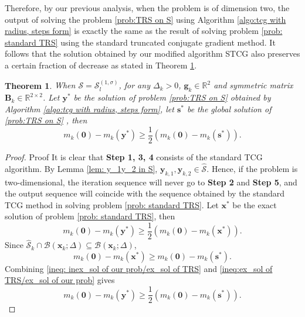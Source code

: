 \documentclass[colorlinks=true, linkcolor=blue, citecolor=blue, urlcolor=blue]{article}
\theoremstyle{plain}
\newtheorem{theorem}{Theorem}[section]
\theoremstyle{definition}
\theoremstyle{remark}
\begin{document}
Therefore, by our previous analysis, when the problem is of dimension two, the output of solving the problem \eqref{prob:TRS on S} using Algorithm \ref{algo:tcg with radius, steps form} is exactly the same as the result of solving problem \eqref{prob: standard TRS} using the standard truncated conjugate gradient method. It follows that the solution obtained by our modified algorithm STCG also preserves a certain fraction of decrease as stated in Theorem \ref{thm:algo3 achieved certain decrease}.
\begin{theorem}\label{thm:algo3 achieved certain decrease}
When $\mathcal{S}=\mathcal{S}_{l}^{(1,\sigma)}$, for any $\Delta_k>0$, $\bm g_k\in\mathbb{R}^2$ and symmetric matrix $\bm B_k\in\mathbb{R}^{2\times 2}$. Let $\bm y^*$ be the solution of problem \eqref{prob:TRS on S} obtained by Algorithm \ref{algo:tcg with radius, steps form}, let $\bm s^*$ be the global solution of \eqref{prob:TRS on S} %
, then 
\begin{equation}\label{ineq:1/2 decrease of our algo}
    m_k(\bm 0)-m_k(\bm y^*)\geq \frac{1}{2}\left(m_k(\bm 0)-m_k(\bm s^*)\right).
\end{equation}
\end{theorem}


\begin{proof}{Proof}
    It is clear that \textbf{Step 1, 3, 4} consists of the standard TCG algorithm. By Lemma \ref{lem: y_1y_2 in S}, $\bm y_{k,1},\bm y_{k,2}\in\hat{\mathcal{S}}$. Hence, if the problem is two-dimensional, the iteration sequence will never go to \textbf{Step 2} and \textbf{Step 5}, and the output sequence will coincide with the sequence obtained by the standard TCG method in solving problem \eqref{prob: standard TRS}.
    Let $\bm x^*$ be the exact solution of problem \eqref{prob: standard TRS}, then 
    \begin{equation}\label{ineq: inex_sol of our prob/ex_sol of TRS}
       m_k(\bm 0)-m_k(\bm y^*)\geq \frac{1}{2}\left(m_k(\bm 0)-m_k(\bm x^*)\right).
    \end{equation} 
    Since $\hat{\mathcal{S}}_k\cap\mathcal{B}(\bm x_k;\Delta)\subseteq \mathcal{B}(\bm x_k;\Delta)$,  \begin{equation}\label{ineq:ex_sol of TRS/ex_sol of our prob}
        m_k(\bm 0)-m_k(\bm x^*)\geq m_k(\bm 0)-m_k(\bm s^*).
    \end{equation}
    Combining \eqref{ineq: inex_sol of our prob/ex_sol of TRS} and \eqref{ineq:ex_sol of TRS/ex_sol of our prob} gives\begin{equation*}%
    m_k(\bm 0)-m_k(\bm y^*)\geq \frac{1}{2}\left(m_k(\bm 0)-m_k(\bm s^*)\right).  \end{equation*}
\end{proof}
\end{document}
